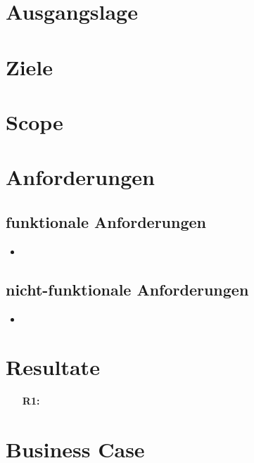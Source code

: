 \section{Ausgangslage}

\section{Ziele}

\section{Scope}

\section{Anforderungen}
\subsection{funktionale Anforderungen}
	\begin{itemize}
        \item 
	\end{itemize}
\subsection{nicht-funktionale Anforderungen}
	\begin{itemize}
		\item 
	\end{itemize}

\section{Resultate}
\begin{itemize}
	\item[\textbf{R1:}] 
\end{itemize}

\section{Business Case}